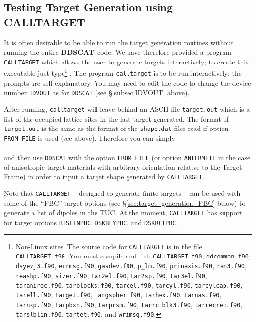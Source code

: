 \subsection{ Testing Target Generation using CALLTARGET}
It is often desirable to be able to run the target generation routines
without running the entire {{\bf DDSCAT}}\ code.  We have therefore
provided a program {\tt CALLTARGET} which allows the user to generate
targets interactively; to create this executable just type\footnote{
	Non-Linux sites: The source code for {\tt CALLTARGET} is in the file
	{\tt CALLTARGET.f90}.  You must compile and link {\tt CALLTARGET.f90}, 
	{\tt ddcommon.f90}, {\tt dsyevj3.f90}, {\tt errmsg.f90}, 
	{\tt gasdev.f90}, {\tt p\_lm.f90},
        {\tt prinaxis.f90}, {\tt ran3.f90}, {\tt reashp.f90}, {\tt sizer.f90},
        {\tt tar2el.f90}, {\tt tar2sp.f90}, {\tt tar3el.f90}, 
        {\tt taranirec.f90},
        {\tt tarblocks.f90}, {\tt tarcel.f90}, {\tt tarcyl.f90}, 
        {\tt tarcylcap.f90}, 
        {\tt tarell.f90}, {\tt target.f90}, {\tt targspher.f90}, 
        {\tt tarhex.f90}, {\tt tarnas.f90}, {\tt tarnsp.f90}, 
	{\tt tarpbxn.f90}, {\tt tarprsm.f90}, {\tt tarrctblk3.f90}, 
        {\tt tarrecrec.f90}, {\tt tarslblin.f90}, 
        {\tt tartet.f90}, and {\tt wrimsg.f90}.
	}  
\hfill\break \indent{} .\hfill\break 
The program {\tt calltarget} is to be run interactively; the prompts are
self-explanatory.  You may need to edit the code to change the device
number {\tt IDVOUT} as for {\tt DDSCAT} (see \S\ref{subsec:IDVOUT}
above).

After running, {\tt calltarget} will leave behind an ASCII file 
{\tt target.out}
which is a list of the occupied lattice sites in the last target generated.
The format of {\tt target.out} is the same as the format of the {\tt shape.dat}
files read if option {\tt FROM\_FILE} is used (see above).
Therefore you can simply \\
\indent{} \\
and then use {\tt DDSCAT}
with the option {\tt FROM\_FILE} (or option {\tt ANIFRMFIL} in the case
of anisotropic target materials with arbitrary orientation relative to
the Target Frame)
in order to input a target shape generated by {\tt CALLTARGET}.

Note that {\tt CALLTARGET} -- designed to generate finite targets -- 
can be used with some of the ``PBC'' target options 
(see \S\ref{sec:target_generation_PBC} below) to generate a list
of dipoles in the TUC.
At the moment, {\tt CALLTARGET} has support for target options
{\tt BISLINPBC}, {\tt DSKBLYPBC}, and {\tt DSKRCTPBC}.

